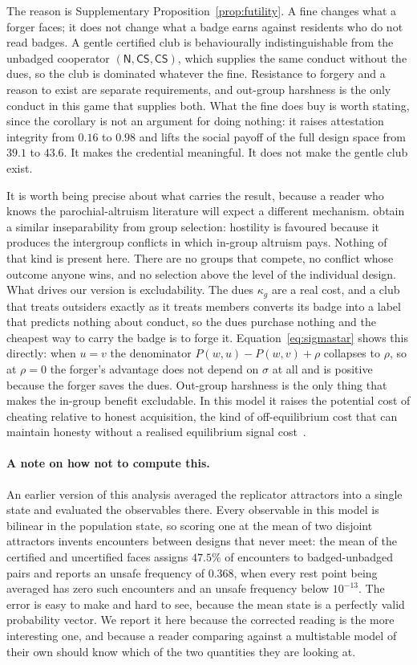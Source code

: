 \documentclass[preprint,12pt]{elsarticle}
\theoremstyle{plain}
\theoremstyle{definition}
\newcommand{\CS}{\textsf{CS}}
\begin{document}
The reason is Supplementary Proposition~\ref{prop:futility}. A fine changes what a forger
faces; it does not change what a badge earns against residents who do not read
badges. A gentle certified club is behaviourally indistinguishable from the
unbadged cooperator $(\mathsf{N}, \CS, \CS)$, which supplies the same conduct
without the dues, so the club is dominated whatever the fine. Resistance to
forgery and a reason to exist are separate requirements, and out-group
harshness is the only conduct in this game that supplies both. What the fine
does buy is worth stating, since the corollary is not an argument for doing
nothing: it raises attestation integrity from $0.16$ to $0.98$ and lifts the
social payoff of the full design space from $39.1$ to $43.6$. It makes the
credential meaningful. It does not make the gentle club exist.

It is worth being precise about what carries the result, because a reader who
knows the parochial-altruism literature will expect a different mechanism.
\citet{choi2007parochial} obtain a similar inseparability from group selection:
hostility is favoured because it produces the intergroup conflicts in which
in-group altruism pays. Nothing of that kind is present here. There are no
groups that compete, no conflict whose outcome anyone wins, and no selection
above the level of the individual design. What drives our version is
excludability. The dues $\kappa_g$ are a real cost, and a club that treats
outsiders exactly as it treats members converts its badge into a label that
predicts nothing about conduct, so the dues purchase nothing and the cheapest
way to carry the badge is to forge it. Equation~\eqref{eq:sigmastar} shows this
directly: when $u = v$ the denominator $P(w,u) - P(w,v) + \rho$ collapses to
$\rho$, so at $\rho = 0$ the forger's advantage does not depend on $\sigma$ at
all and is positive because the forger saves the dues. Out-group harshness is
the only thing that makes the in-group benefit excludable. In this model it
raises the potential cost of cheating relative to honest acquisition, the kind
of off-equilibrium cost that can maintain honesty without a realised
equilibrium signal cost~\citep{szamado2011cost}.

\paragraph{A note on how not to compute this.}
An earlier version of this analysis averaged the replicator attractors into a
single state and evaluated the observables there. Every observable in this
model is bilinear in the population state, so scoring one at the mean of two
disjoint attractors invents encounters between designs that never meet: the
mean of the certified and uncertified faces assigns $47.5\%$ of encounters to
badged-unbadged pairs and reports an unsafe frequency of $0.368$, when every
rest point being averaged has zero such encounters and an unsafe frequency below
$10^{-13}$. The error is easy to make and hard to see, because the mean state
is a perfectly valid probability vector. We report it here because the
corrected reading is the more interesting one, and because a reader comparing
against a multistable model of their own should know which of the two
quantities they are looking at.
\end{document}
